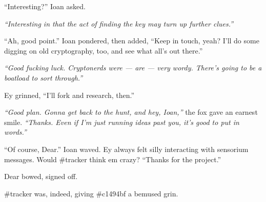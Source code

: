 ``Interesting?'' Ioan asked.

\emph{``Interesting in that the act of finding the key may turn up further clues.''}

``Ah, good point.'' Ioan pondered, then added, ``Keep in touch, yeah? I'll do some digging on old cryptography, too, and see what all's out there.''

\emph{``Good fucking luck. Cryptonerds were --- are --- very wordy. There's going to be a boatload to sort through.''}

Ey grinned, ``I'll fork and research, then.''

\emph{``Good plan. Gonna get back to the hunt, and hey, Ioan,''} the fox gave an earnest smile. \emph{``Thanks. Even if I'm just running ideas past you, it's good to put in words.''}

``Of course, Dear.'' Ioan waved. Ey always felt silly interacting with sensorium messages. Would \#tracker think em crazy? ``Thanks for the project.''

Dear bowed, signed off.

\#tracker was, indeed, giving \#c1494bf a bemused grin.
